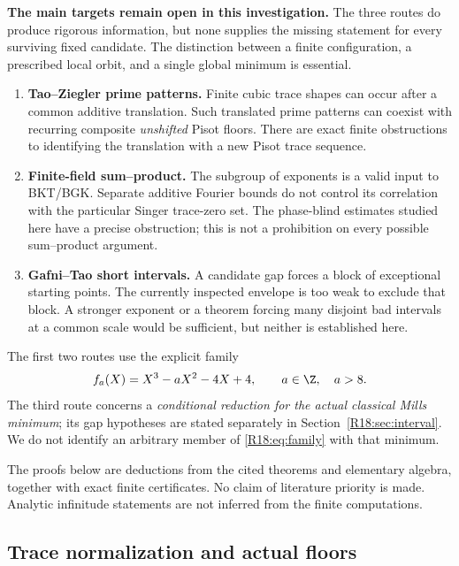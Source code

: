 \documentclass[11pt,a4paper]{article}
\theoremstyle{definition}\newtheorem{definition}[theorem]{Definition}
\theoremstyle{remark}\newtheorem{remark}[theorem]{Remark}
\begin{document}
\textbf{The main targets remain open in this investigation.}
The three routes do produce rigorous information, but none supplies the
missing statement for every surviving fixed candidate. The distinction
between a finite configuration, a prescribed local orbit, and a single
global minimum is essential.

\begin{enumerate}
\item \textbf{Tao--Ziegler prime patterns.} Finite cubic trace shapes can
occur after a common additive translation. Such translated prime patterns
can coexist with recurring composite \emph{unshifted} Pisot floors.
There are exact finite obstructions to identifying the translation with
a new Pisot trace sequence.
\item \textbf{Finite-field sum--product.} The subgroup of exponents is a
valid input to BKT/BGK. Separate additive Fourier bounds do not control
its correlation with the particular Singer trace-zero set. The
phase-blind estimates studied here have a precise obstruction; this is
not a prohibition on every possible sum--product argument.
\item \textbf{Gafni--Tao short intervals.} A candidate gap forces a block
of exceptional starting points. The currently inspected envelope is too
weak to exclude that block. A stronger exponent or a theorem forcing
many disjoint bad intervals at a common scale would be sufficient, but
neither is established here.
\end{enumerate}

The first two routes use the explicit family
\begin{equation}\label{R18:eq:family}
 f_a(X)=X^3-aX^2-4X+4,\qquad a\in\Z,\quad a>8.
\end{equation}
The third route concerns a \emph{conditional reduction for the actual
classical Mills minimum}; its gap hypotheses are stated separately in
Section~\ref{R18:sec:interval}. We do not identify an arbitrary member of
\eqref{R18:eq:family} with that minimum.

The proofs below are deductions from the cited theorems and elementary
algebra, together with exact finite certificates. No claim of literature
priority is made. Analytic infinitude statements are not inferred from
the finite computations.

\subsection{Trace normalization and actual floors}
\end{document}
